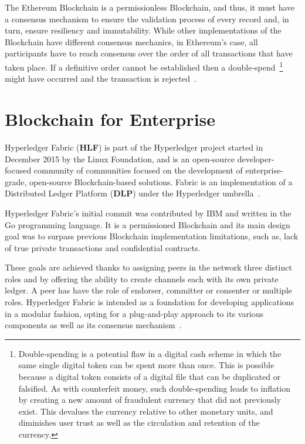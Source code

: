 The Ethereum Blockchain is a permissionless Blockchain, and thus, it must have
a consensus mechanism to ensure the validation process of every record and, in
turn, ensure resiliency and immutability. While other implementations of the
Blockchain have different consensus mechanics, in Ethereum’s case, all
participants have to reach consensus over the order of all transactions that
have taken place. If a definitive order cannot be established then a
double-spend~\footnote{Double-spending is a potential flaw in a digital cash
scheme in which the same single digital token can be spent more than once.
This is possible because a digital token consists of a digital file that can be
duplicated or falsified. As with counterfeit money, such double-spending leads
to inflation by creating a new amount of fraudulent currency that did not
previously exist. This devalues the currency relative to other monetary units,
and diminishes user trust as well as the circulation and retention of the
currency.} might have occurred and the transaction is rejected~\cite{Wood2017}.

\section{Blockchain for Enterprise}\label{enterpriseBlockchain}

Hyperledger Fabric (\textbf{HLF}) is part of the Hyperledger project started in
December 2015 by the Linux Foundation, and is an open-source developer-focused
community of communities focused on the development of enterprise-grade,
open-source Blockchain-based solutions.  Fabric is an implementation of a
Distributed Ledger Platform (\textbf{DLP}) under the Hyperledger
umbrella~\cite{Cachin2016}.

Hyperledger Fabric’s initial commit was contributed by IBM and written in the
Go programming language.  It is a permissioned Blockchain and its main design
goal was to surpass previous Blockchain implementation limitations, such as,
lack of true private transactions and confidential contracts.

These goals are achieved thanks to assigning peers in the network three
distinct roles and by offering the ability to create channels each with its own
private ledger.  A peer has have the role of endorser, committer or consenter
or multiple roles.  Hyperledger Fabric is intended as a foundation for
developing applications in a modular fashion, opting for a plug-and-play
approach to its various components as well as its consensus
mechanism~\cite{HyperledgerFabricDocs2017}.

